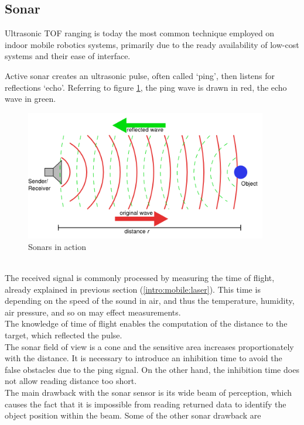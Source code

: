 \subsection{Sonar}
\label{intro:mobile:sonar}

Ultrasonic TOF ranging is today the most common technique employed
on indoor mobile robotics systems, primarily due to the ready
availability of low-cost systems and their ease of interface.

Active sonar creates an ultrasonic pulse, often called `ping',
then listens for reflections `echo'. Referring to figure
\ref{fig:sonar}, the ping wave is drawn in red, the echo wave
in green.
\begin{figure} [h]
  \begin{center}
    \includegraphics[width=300pt]{img/sonar.png}
    \caption{Sonars in action}
    \label{fig:sonar}
  \end{center}
\end{figure}
\\
The received signal is commonly processed by measuring the time of flight,
already explained in previous section (\ref{intro:mobile:laser}).
This time is depending on the speed of the sound in air, and thus the
temperature, humidity, air pressure, and so on may effect measurements.
\\
The knowledge of time of flight enables the computation of the distance
to the target, which reflected the pulse.
\\
The sonar field of view is a cone and the sensitive area increases
proportionately with the distance. It is necessary to introduce an
inhibition time to avoid the false obstacles due to the ping signal.
On the other hand, the inhibition time does not allow reading
distance too short.
\\
The main drawback with the sonar sensor is its wide beam of perception, which
causes the fact that it is impossible from reading returned data to identify
the object position within the beam. Some of the other sonar drawback are
